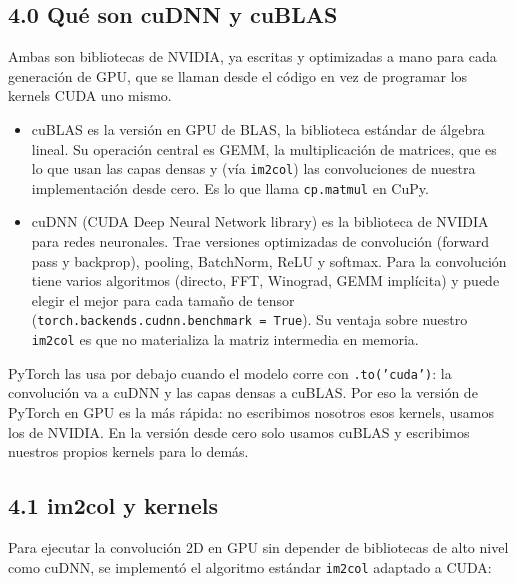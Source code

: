 \documentclass[
  11pt,
]{article}
\providecommand{\tightlist}{%
  \setlength{\itemsep}{0pt}\setlength{\parskip}{0pt}}
\begin{document}
\subsection{4.0 Qué son cuDNN y cuBLAS}\label{cudnn}

Ambas son bibliotecas de NVIDIA, ya escritas y optimizadas a mano para cada generación de GPU, que se llaman desde el código en vez de programar
los kernels CUDA uno mismo.
\begin{itemize}
\tightlist
\item cuBLAS es la versión en GPU de BLAS, la biblioteca estándar de álgebra lineal. Su operación central es GEMM, la multiplicación de matrices, que es lo que
  usan las capas densas y (vía \texttt{im2col}) las convoluciones de nuestra implementación desde cero. Es lo que llama \texttt{cp.matmul} en CuPy.
\item cuDNN (CUDA Deep Neural Network library) es la biblioteca de NVIDIA para redes neuronales. Trae versiones optimizadas de convolución (forward pass y backprop), pooling,
  BatchNorm, ReLU y softmax. Para la convolución tiene varios algoritmos (directo, FFT, Winograd, GEMM implícita) y puede elegir el mejor para cada tamaño de tensor
  (\texttt{torch.backends.cudnn.benchmark = True}). Su ventaja sobre nuestro \texttt{im2col} es que no materializa la matriz intermedia en memoria.
\end{itemize}
PyTorch las usa por debajo cuando el modelo corre con \texttt{.to('cuda')}: la convolución va a cuDNN y las capas densas a cuBLAS. Por eso la versión
de PyTorch en GPU es la más rápida: no escribimos nosotros esos kernels, usamos los de NVIDIA. En la versión desde cero solo usamos cuBLAS y escribimos
nuestros propios kernels para lo demás.

\subsection{4.1 im2col y kernels}\label{algoritmo-im2col-y-mapeo-matricial-en-gpu-cupy-scratch}

Para ejecutar la convolución 2D en GPU sin depender de
bibliotecas de alto nivel como cuDNN, se implementó el
algoritmo estándar \texttt{im2col} adaptado a CUDA:
\end{document}
